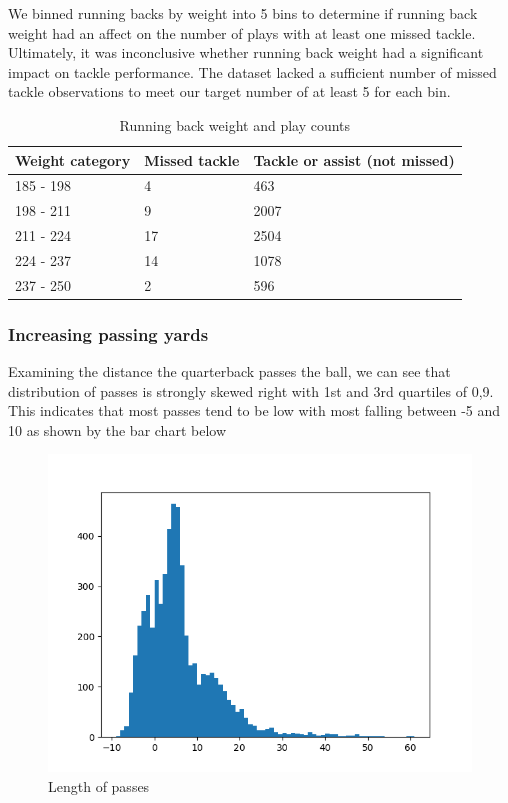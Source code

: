 \documentclass[bibtex, sigconf, hyperref={colorlinks=true,linkcolor=blue,urlcolor=blue}]{acmart}
\begin{document}
We binned running backs by weight into 5 bins to determine if running back
weight had an affect on the number of plays with at least one missed tackle.
Ultimately, it was inconclusive whether running back weight had a significant
impact on tackle performance. The dataset lacked a sufficient number of missed
tackle observations to meet our target number of at least 5 for each bin.

\begin{table}[H]
  \caption{Running back weight and play counts}
  \label{tab:freq}
  \begin{tabular}{lll}
    \toprule
    Weight category & Missed tackle & Tackle or assist (not missed) \\
    \midrule
    185 - 198 & 4 & 463 \\
    198 - 211 & 9 & 2007 \\
    211 - 224 & 17 & 2504 \\
    224 - 237 & 14 & 1078 \\
    237 - 250 & 2 & 596 \\
  \end{tabular}
\end{table}

\subsubsection{Increasing passing yards}

Examining the distance the quarterback passes the ball, we can see that
distribution of passes is strongly skewed right with 1st and 3rd quartiles of 0,9.
This indicates that most passes tend to be low with most falling between -5 and
10 as shown by the bar chart below
\begin{figure}[h]
  \centering
  \includegraphics[width=\linewidth]{passlength}
  \caption{Length of passes}
\end{figure}
\end{document}
